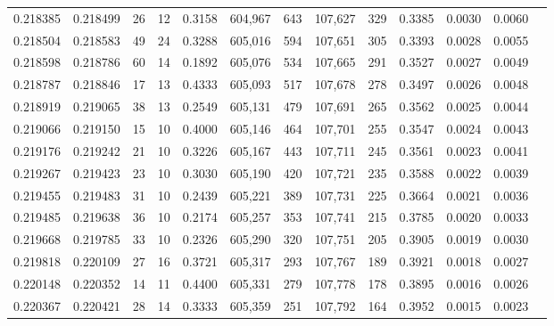 \begin{tabular}{rrrrrrrrrrrrr}
0.218385 & 0.218499 &    26 &  12 &                                     0.3158 & 604,967 &     643 & 107,627 &     329 & 0.3385 & 0.0030 & 0.0060 \\
0.218504 & 0.218583 &    49 &  24 &                                     0.3288 & 605,016 &     594 & 107,651 &     305 & 0.3393 & 0.0028 & 0.0055 \\
0.218598 & 0.218786 &    60 &  14 &                                     0.1892 & 605,076 &     534 & 107,665 &     291 & 0.3527 & 0.0027 & 0.0049 \\
0.218787 & 0.218846 &    17 &  13 &                                     0.4333 & 605,093 &     517 & 107,678 &     278 & 0.3497 & 0.0026 & 0.0048 \\
0.218919 & 0.219065 &    38 &  13 &                                     0.2549 & 605,131 &     479 & 107,691 &     265 & 0.3562 & 0.0025 & 0.0044 \\
0.219066 & 0.219150 &    15 &  10 &                                     0.4000 & 605,146 &     464 & 107,701 &     255 & 0.3547 & 0.0024 & 0.0043 \\
0.219176 & 0.219242 &    21 &  10 &                                     0.3226 & 605,167 &     443 & 107,711 &     245 & 0.3561 & 0.0023 & 0.0041 \\
0.219267 & 0.219423 &    23 &  10 &                                     0.3030 & 605,190 &     420 & 107,721 &     235 & 0.3588 & 0.0022 & 0.0039 \\
0.219455 & 0.219483 &    31 &  10 &                                     0.2439 & 605,221 &     389 & 107,731 &     225 & 0.3664 & 0.0021 & 0.0036 \\
0.219485 & 0.219638 &    36 &  10 &                                     0.2174 & 605,257 &     353 & 107,741 &     215 & 0.3785 & 0.0020 & 0.0033 \\
0.219668 & 0.219785 &    33 &  10 &                                     0.2326 & 605,290 &     320 & 107,751 &     205 & 0.3905 & 0.0019 & 0.0030 \\
0.219818 & 0.220109 &    27 &  16 &                                     0.3721 & 605,317 &     293 & 107,767 &     189 & 0.3921 & 0.0018 & 0.0027 \\
0.220148 & 0.220352 &    14 &  11 &                                     0.4400 & 605,331 &     279 & 107,778 &     178 & 0.3895 & 0.0016 & 0.0026 \\
0.220367 & 0.220421 &    28 &  14 &                                     0.3333 & 605,359 &     251 & 107,792 &     164 & 0.3952 & 0.0015 & 0.0023 \\

\end{tabular}
